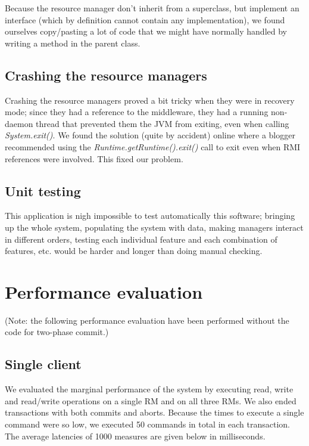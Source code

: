 \documentclass[11pt]{article}
\begin{document}
Because the resource manager don't inherit from a superclass, but
implement an interface (which by definition cannot contain any
implementation), we found ourselves copy/pasting a lot of code that we
might have normally handled by writing a method in the parent class.



\subsection{Crashing the resource managers}

Crashing the resource managers proved a bit tricky when they were in
recovery mode; since they had a reference to the middleware, they had
a running non-daemon thread that prevented them the JVM from exiting,
even when calling {\it System.exit()}.  We found the solution (quite
by accident) online where a blogger recommended using the {\it
  Runtime.getRuntime().exit()} call to exit even when RMI references
were involved.  This fixed our problem.


\subsection{Unit testing}

This application is nigh impossible to test automatically this
software; bringing up the whole system, populating the system with
data, making managers interact in different orders, testing each
individual feature and each combination of features, etc. would be
harder and longer than doing manual checking.


\section{Performance evaluation}

(Note: the following performance evaluation have been performed
without the code for two-phase commit.)

\subsection{Single client}

We evaluated the marginal performance of the system by executing read,
write and read/write operations on a single RM and on all three RMs.
We also ended transactions with both commits and aborts.  Because the
times to execute a single command were so low, we executed 50 commands
in total in each transaction.  The average latencies of 1000 measures
are given below in milliseconds.
\end{document}
